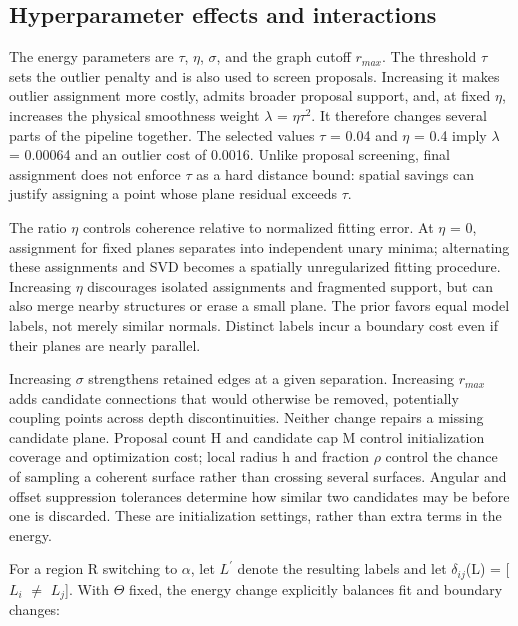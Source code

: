 \subsection{Hyperparameter effects and interactions}\label{hyperparameter-effects-and-interactions}

The energy parameters are \(\tau\), \(\eta\), \(\sigma\), and the graph cutoff \(r_{max}\). The threshold \(\tau\) sets the outlier penalty and is also used to screen proposals. Increasing it makes outlier assignment more costly, admits broader proposal support, and, at fixed \(\eta\), increases the physical smoothness weight \(\lambda\) = \(\eta\)\(\tau^{2}\). It therefore changes several parts of the pipeline together. The selected values \(\tau\) = 0.04 and \(\eta\) = 0.4 imply \(\lambda\) = 0.00064 and an outlier cost of 0.0016. Unlike proposal screening, final assignment does not enforce \(\tau\) as a hard distance bound: spatial savings can justify assigning a point whose plane residual exceeds \(\tau\).

The ratio \(\eta\) controls coherence relative to normalized fitting error. At \(\eta\) = 0, assignment for fixed planes separates into independent unary minima; alternating these assignments and SVD becomes a spatially unregularized fitting procedure. Increasing \(\eta\) discourages isolated assignments and fragmented support, but can also merge nearby structures or erase a small plane. The prior favors equal model labels, not merely similar normals. Distinct labels incur a boundary cost even if their planes are nearly parallel.

Increasing \(\sigma\) strengthens retained edges at a given separation. Increasing \(r_{max}\) adds candidate connections that would otherwise be removed, potentially coupling points across depth discontinuities. Neither change repairs a missing candidate plane. Proposal count H and candidate cap M control initialization coverage and optimization cost; local radius h and fraction \(\rho\) control the chance of sampling a coherent surface rather than crossing several surfaces. Angular and offset suppression tolerances determine how similar two candidates may be before one is discarded. These are initialization settings, rather than extra terms in the energy.

For a region R switching to \(\alpha\), let \(L^{'}\) denote the resulting labels and let \(\delta_{ij}\)(L) = {[}\(L_{i}\) \(\ne\) \(L_{j}\){]}. With \(\Theta\) fixed, the energy change explicitly balances fit and boundary changes:

